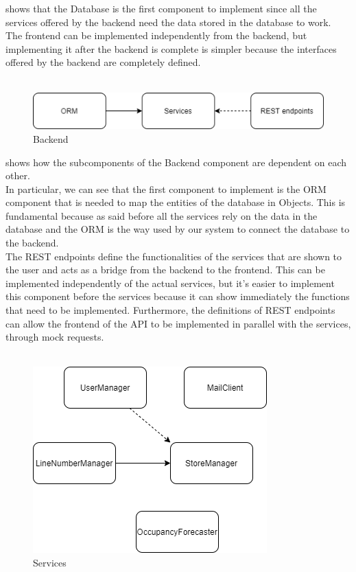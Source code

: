  shows that the Database is the first component to implement since all the services offered by the backend
need the data stored in the database to work. \\
The frontend can be implemented independently from the backend, but implementing it after the backend is complete is simpler because the interfaces
offered by the backend are completely defined.\\
\\
\begin{figure}[H]
    \centering
    \includegraphics{Images/IntegrationAndTestingPlan/Backend.png}
    \caption{Backend}
    \label{fig:Backend}
\end{figure}
 shows how the subcomponents of the Backend component are dependent on each other. \\
In particular, we can see that the first component to implement is the ORM component that is needed to map the entities of the database in Objects. This is fundamental because as said before all the services rely on the data in the database and the ORM is
the way used by our system to connect the database to the backend.\\
The REST endpoints define the functionalities of the services that are shown to the user and acts as a bridge from the backend
to the frontend.
This can be implemented independently of the actual services, but it's easier to implement this component before the services because
it can show immediately the functions that need to be implemented.
Furthermore, the definitions of REST endpoints can allow the frontend of the API to be implemented in parallel with the services, through mock requests.\\
\\
\begin{figure}[H]
    \centering
    \includegraphics[height=0.4\textwidth]{Images/IntegrationAndTestingPlan/Services.png}
    \caption{Services}
    \label{fig:Services}
\end{figure}
